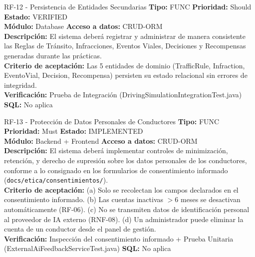 \documentclass[11pt,a4paper]{article}
\begin{document}
\begin{requisito}{RF-12 - Persistencia de Entidades Secundarias}
    \textbf{Tipo:} FUNC \quad \textbf{Prioridad:} Should \quad \textbf{Estado:} VERIFIED \\[0.2cm]
    \textbf{Módulo:} Database \quad \textbf{Acceso a datos:} CRUD-ORM \\[0.2cm]
    \textbf{Descripción:} El sistema deberá registrar y administrar de manera consistente las Reglas de Tránsito, Infracciones, Eventos Viales, Decisiones y Recompensas generadas durante las prácticas. \\[0.2cm]
    \textbf{Criterio de aceptación:} Las 5 entidades de dominio (TrafficRule, Infraction, EventoVial, Decision, Recompensa) persisten su estado relacional sin errores de integridad. \\[0.2cm]
    \textbf{Verificación:} Prueba de Integración (DrivingSimulationIntegrationTest.java) \quad \textbf{SQL:} No aplica
\end{requisito}

\begin{requisito}{RF-13 - Protección de Datos Personales de Conductores}
    \textbf{Tipo:} FUNC \quad \textbf{Prioridad:} Must \quad \textbf{Estado:} IMPLEMENTED \\[0.2cm]
    \textbf{Módulo:} Backend + Frontend \quad \textbf{Acceso a datos:} CRUD-ORM \\[0.2cm]
    \textbf{Descripción:} El sistema deberá implementar controles de minimización, retención, y derecho de supresión sobre los datos personales de los conductores, conforme a lo consignado en los formularios de consentimiento informado (\texttt{docs/etica/consentimientos/}). \\[0.2cm]
    \textbf{Criterio de aceptación:} (a) Solo se recolectan los campos declarados en el consentimiento informado. (b) Las cuentas inactivas $>6$ meses se desactivan automáticamente (RF-06). (c) No se transmiten datos de identificación personal al proveedor de IA externo (RNF-08). (d) Un administrador puede eliminar la cuenta de un conductor desde el panel de gestión. \\[0.2cm]
    \textbf{Verificación:} Inspección del consentimiento informado + Prueba Unitaria (ExternalAiFeedbackServiceTest.java) \quad \textbf{SQL:} No aplica
\end{requisito}
\end{document}
